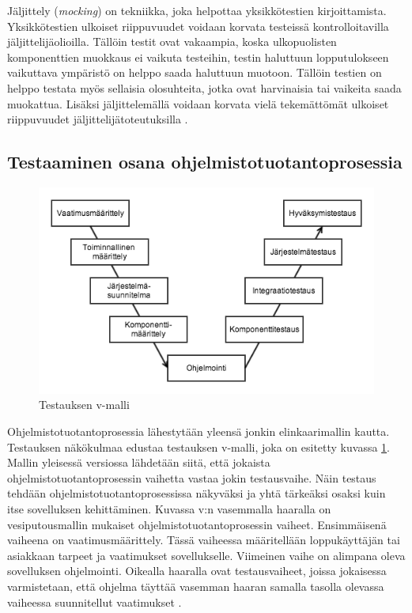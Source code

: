 Jäljittely (\emph{mocking}) on tekniikka, joka helpottaa yksikkötestien kirjoittamista. Yksikkötestien ulkoiset riippuvuudet voidaan korvata testeissä kontrolloitavilla jäljittelijäolioilla. Tällöin testit ovat vakaampia, koska ulkopuolisten komponenttien muokkaus ei vaikuta testeihin, testin haluttuun lopputulokseen vaikuttava ympäristö on helppo saada haluttuun muotoon. Tällöin testien on helppo testata myös sellaisia olosuhteita, jotka ovat harvinaisia tai vaikeita saada muokattua. Lisäksi jäljittelemällä voidaan korvata vielä tekemättömät ulkoiset riippuvuudet jäljittelijätoteutuksilla \cite{mocking}.

\subsection{Testaaminen osana ohjelmistotuotantoprosessia}

\begin{figure}[htb]
\includegraphics[width=140mm]{v_malli.png}
\caption{Testauksen v-malli \protect\cite[40]{testing_foundations}} \label{v_model}
\end{figure}

Ohjelmistotuotantoprosessia lähestytään yleensä jonkin elinkaarimallin kautta. Testauksen näkökulmaa edustaa testauksen v-malli, joka on esitetty kuvassa \ref{v_model}. Mallin yleisessä versiossa lähdetään siitä, että jokaista ohjelmistotuotantoprosessin vaihetta vastaa jokin testausvaihe. Näin testaus tehdään ohjelmistotuotantoprosessissa näkyväksi ja yhtä tärkeäksi osaksi kuin itse sovelluksen kehittäminen. Kuvassa v:n vasemmalla haaralla on vesiputousmallin mukaiset ohjelmistotuotantoprosessin vaiheet. Ensimmäisenä vaiheena on vaatimusmäärittely. Tässä vaiheessa määritellään loppukäyttäjän tai asiakkaan tarpeet ja vaatimukset sovellukselle.  Viimeinen vaihe on alimpana oleva sovelluksen ohjelmointi. Oikealla haaralla ovat testausvaiheet, joissa jokaisessa varmistetaan, että ohjelma täyttää vasemman haaran samalla tasolla olevassa vaiheessa suunnitellut vaatimukset \cite[39-42]{testing_foundations}.

